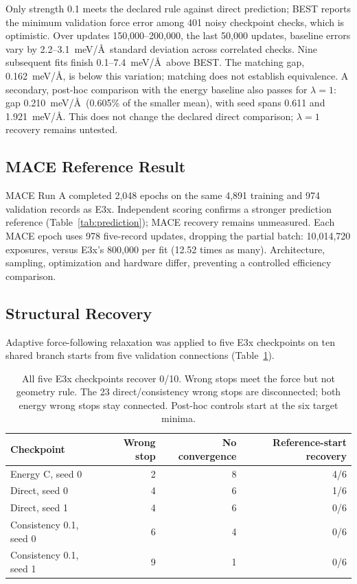 \documentclass{article}
\begin{document}
Only strength 0.1 meets the declared rule against direct prediction; BEST reports the minimum validation force error among 401 noisy checkpoint checks, which is optimistic. Over updates 150,000--200,000, the last 50,000 updates, baseline errors vary by 2.2--3.1~meV/\AA\ standard deviation across correlated checks. Nine subsequent fits finish 0.1--7.4~meV/\AA\ above BEST. The matching gap, 0.162~meV/\AA, is below this variation; matching does not establish equivalence. A secondary, post-hoc comparison with the energy baseline also passes for $\lambda=1$: gap 0.210~meV/\AA\ (0.605\% of the smaller mean), with seed spans 0.611 and 1.921~meV/\AA. This does not change the declared direct comparison; $\lambda=1$ recovery remains untested.

\subsection{MACE Reference Result}
MACE Run A completed 2,048 epochs on the same 4,891 training and 974 validation records as E3x. Independent scoring confirms a stronger prediction reference (Table~\ref{tab:prediction}); MACE recovery remains unmeasured. Each MACE epoch uses 978 five-record updates, dropping the partial batch: 10,014,720 exposures, versus E3x's 800,000 per fit (12.52 times as many). Architecture, sampling, optimization and hardware differ, preventing a controlled efficiency comparison.

\subsection{Structural Recovery}
Adaptive force-following relaxation was applied to five E3x checkpoints on ten shared branch starts from five validation connections (Table~\ref{tab:recovery}).

\begin{table}[H]
\centering\small
\caption{All five E3x checkpoints recover 0/10. Wrong stops meet the force but not geometry rule. The 23 direct/consistency wrong stops are disconnected; both energy wrong stops stay connected. Post-hoc controls start at the six target minima.}\label{tab:recovery}
\begin{tabular}{lrrr}\toprule
Checkpoint & Wrong stop & No convergence & Reference-start recovery\\\midrule
Energy C, seed 0 & 2 & 8 & 4/6\\
Direct, seed 0 & 4 & 6 & 1/6\\
Direct, seed 1 & 4 & 6 & 0/6\\
Consistency 0.1, seed 0 & 6 & 4 & 0/6\\
Consistency 0.1, seed 1 & 9 & 1 & 0/6\\\bottomrule
\end{tabular}
\end{table}
\end{document}
